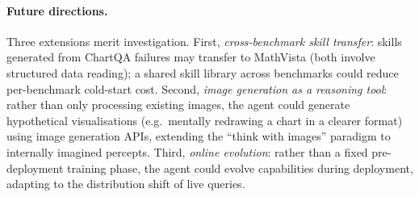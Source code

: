 \paragraph{Future directions.}
Three extensions merit investigation.
First, \emph{cross-benchmark skill transfer}: skills generated from ChartQA failures may
transfer to MathVista (both involve structured data reading); a shared skill library across
benchmarks could reduce per-benchmark cold-start cost.
Second, \emph{image generation as a reasoning tool}: rather than only processing existing images,
the agent could generate hypothetical visualisations (e.g.\ mentally redrawing a chart in a
clearer format) using image generation APIs, extending the ``think with images'' paradigm
\citep{vtoolr1_2025} to internally imagined percepts.
Third, \emph{online evolution}: rather than a fixed pre-deployment training phase, the agent
could evolve capabilities during deployment, adapting to the distribution shift of live queries.
